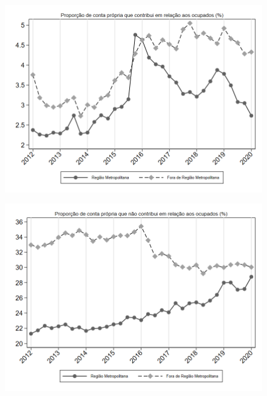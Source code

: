 \begin{frame}[label=_composicao_demografica_regiao_metro_prop_cpropriaC]{}
\textit{\hyperlink{_composicao_demografica_regiao_metro}{}}
\begin{figure}
  \centering
  \includegraphics[width=1.0\linewidth]{../../analysis/output/composicao_demografica/area_geografica/_composicao_demografica_regiao_metro_prop_cpropriaC.png}
  \caption{}
  \label{fig:_composicao_demografica_regiao_metro_prop_cpropriaC}
\end{figure}
\end{frame}

\begin{frame}[label=_composicao_demografica_regiao_metro_prop_cpropriaNc]{}
\textit{\hyperlink{_composicao_demografica_regiao_metro}{}}
\begin{figure}
  \centering
  \includegraphics[width=1.0\linewidth]{../../analysis/output/composicao_demografica/area_geografica/_composicao_demografica_regiao_metro_prop_cpropriaNc.png}
  \caption{}
  \label{fig:_composicao_demografica_regiao_metro_prop_cpropriaNc}
\end{figure}
\end{frame}